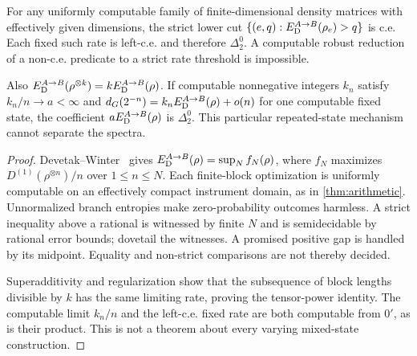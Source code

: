 \begin{proposition}\label{prop:fixed-state-cut}
For any uniformly computable family of finite-dimensional density matrices with effectively given dimensions, the strict lower cut $\{(e,q):E_{\mathrm D}^{A\to B}(\rho_e)>q\}$ is c.e. Each fixed such rate is left-c.e. and therefore $\Delta^0_2$. A computable robust reduction of a non-c.e. predicate to a strict rate threshold is impossible.

Also $E_{\mathrm D}^{A\to B}(\rho^{\otimes k})=kE_{\mathrm D}^{A\to B}(\rho)$. If computable nonnegative integers $k_n$ satisfy $k_n/n\to a<\infty$ and $d_G(2^{-n})=k_nE_{\mathrm D}^{A\to B}(\rho)+o(n)$ for one computable fixed state, the coefficient $aE_{\mathrm D}^{A\to B}(\rho)$ is $\Delta^0_2$. This particular repeated-state mechanism cannot separate the spectra.
\end{proposition}
\begin{proof}
Devetak--Winter~\cite[Theorem~13]{DW05} gives $E_{\mathrm D}^{A\to B}(\rho)=\sup_Nf_N(\rho)$, where $f_N$ maximizes $D^{(1)}(\rho^{\otimes n})/n$ over $1\le n\le N$. Each finite-block optimization is uniformly computable on an effectively compact instrument domain, as in \cref{thm:arithmetic}. Unnormalized branch entropies make zero-probability outcomes harmless. A strict inequality above a rational is witnessed by finite $N$ and is semidecidable by rational error bounds; dovetail the witnesses. A promised positive gap is handled by its midpoint. Equality and non-strict comparisons are not thereby decided.

Superadditivity and regularization show that the subsequence of block lengths divisible by $k$ has the same limiting rate, proving the tensor-power identity. The computable limit $k_n/n$ and the left-c.e. fixed rate are both computable from $0'$, as is their product. This is not a theorem about every varying mixed-state construction.
\end{proof}

